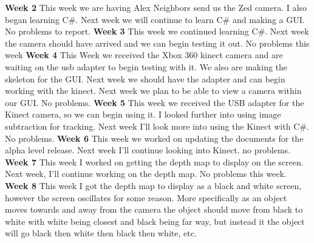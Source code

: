 \documentclass[onecolumn, draftclsnofoot,10pt, compsoc]{IEEEtran}
\begin{document}
\textbf{Week 2}
\newline
This week we are having Alex Neighbors send us the Zed camera. I also began learning C\#.
\newline
Next week we will continue to learn C\# and making a GUI.
\newline
No problems to report.
\newline
\textbf{Week 3}
\newline
This week we continued learning C\#.
\newline
Next week the camera should have arrived and we can begin testing it out.
\newline
No problems this week
\newline
\textbf{Week 4}
\newline
This Week we received the Xbox 360 kinect camera and are waiting on the usb adapter to begin testing with it. We also are making the skeleton for the GUI.
\newline
Next week we should have the adapter and can begin working with the kinect. Next week we plan to be able to view a camera within our GUI.
\newline
No problems.
\newline
\textbf{Week 5}
\newline
This week we received the USB adapter for the Kinect camera, so we can begin using it. I looked further into using image subtraction for tracking.
\newline
Next week I'll look more into using the Kinect with C\#.
\newline
No problems.
\newline
\textbf{Week 6}
\newline
This week we worked on updating the documents for the alpha level release.
\newline
Next week I'll continue looking into Kinect.
\newline
no problems.
\newline
\textbf{Week 7}
\newline
This week I worked on getting the depth map to display on the screen.
\newline
Next week, I'll continue working on the depth map.
\newline
No problems this week.
\newline
\textbf{Week 8}
\newline
This week I got the depth map to display as a black and white screen, however the screen oscillates for some reason. More specifically as an object moves towards and away from the camera the object should move from black to white with white being closest and black being far way, but instead it the object will go black then white then black then white, etc.
\end{document}
